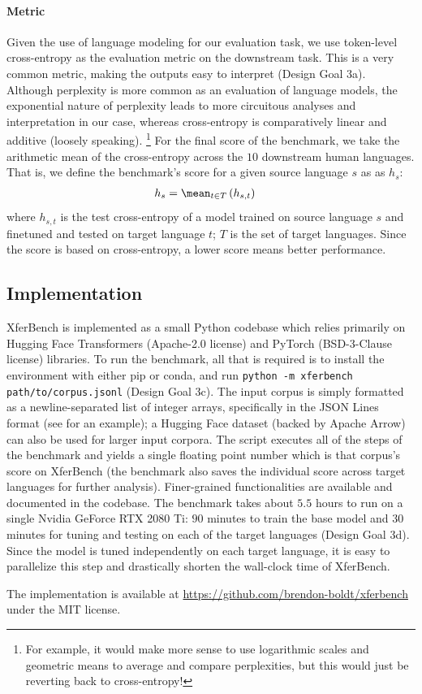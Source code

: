 \paragraph{Metric}

Given the use of language modeling for our evaluation task, we use token-level cross-entropy as the evaluation metric on the downstream task.
This is a very common metric, making the outputs easy to interpret (Design Goal 3a).
Although perplexity is more common as an evaluation of language models, the exponential nature of perplexity leads to more circuitous analyses and interpretation in our case, whereas cross-entropy is comparatively linear and additive (loosely speaking).
\unskip\footnote{For example, it would make more sense to use logarithmic scales and geometric means to average and compare perplexities, but this would just be reverting back to cross-entropy!}
For the final score of the benchmark, we take the arithmetic mean of the cross-entropy across the $10$ downstream human languages.
That is, we define the benchmark's score for a given source language $s$ as as $h_s$:
\begin{align}
  h_{s} &= \mean_{t \in T}\left( h_{s,t}\right)
  \label{eq:hs}
\end{align}
where $h_{s,t}$ is the test cross-entropy of a model trained on source language $s$ and finetuned and tested on target language $t$;
  $T$ is the set of target languages.
Since the score is based on cross-entropy, a lower score means better performance.


\subsection{Implementation}
\unskip\label{sec:implementation}

XferBench is implemented as a small Python codebase which relies primarily on Hugging Face Transformers \citep{Wolf2019HuggingFacesTS} (Apache-2.0 license) and PyTorch \citep{pytorch} (BSD-3-Clause license) libraries.
To run the benchmark, all that is required is to install the environment with either pip or conda, and run {\small\texttt{python -m xferbench path/to/corpus.jsonl}} (Design Goal 3c).
The input corpus is simply formatted as a newline-separated list of integer arrays, specifically in the JSON Lines format (see  for an example); a Hugging Face dataset (backed by Apache Arrow) can also be used for larger input corpora.
The script executes all of the steps of the benchmark and yields a single floating point number which is that corpus's score on XferBench (the benchmark also saves the individual score across target languages for further analysis).
Finer-grained functionalities are available and documented in the codebase.
The benchmark takes about $5.5$ hours to run on a single Nvidia GeForce RTX 2080 Ti:
  $90$ minutes to train the base model and $30$ minutes for tuning and testing on each of the target languages (Design Goal 3d).
Since the model is tuned independently on each target language, it is easy to parallelize this step and drastically shorten the wall-clock time of XferBench.

The implementation is available at \url{https://github.com/brendon-boldt/xferbench} under the MIT license.

